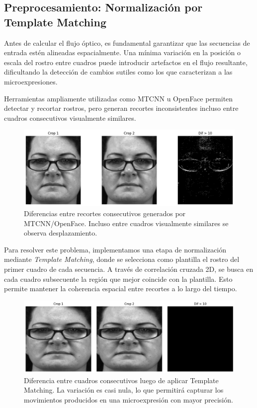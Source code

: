 \documentclass[conference]{IEEEtran}
\begin{document}
\subsection{Preprocesamiento: Normalización por Template Matching}

Antes de calcular el flujo óptico, es fundamental garantizar que las secuencias de entrada estén alineadas espacialmente. Una mínima variación en la posición o escala del rostro entre cuadros puede introducir artefactos en el flujo resultante, dificultando la detección de cambios sutiles como los que caracterizan a las microexpresiones.

Herramientas ampliamente utilizadas como MTCNN u OpenFace permiten detectar y recortar rostros, pero generan recortes inconsistentes incluso entre cuadros consecutivos visualmente similares.

\begin{figure}[h]
\centering
\includegraphics[width=0.9\linewidth]{figs/diff_before.png}
\caption{Diferencias entre recortes consecutivos generados por MTCNN/OpenFace. Incluso entre cuadros visualmente similares se observa desplazamiento.}
\label{fig:before_alignment}
\end{figure}

Para resolver este problema, implementamos una etapa de normalización mediante \textit{Template Matching}, donde se selecciona como plantilla el rostro del primer cuadro de cada secuencia. A través de correlación cruzada 2D, se busca en cada cuadro subsecuente la región que mejor coincide con la plantilla. Esto permite mantener la coherencia espacial entre recortes a lo largo del tiempo.

\begin{figure}[h]
\centering
\includegraphics[width=0.9\linewidth]{figs/diff_after.png}
\caption{Diferencia entre cuadros consecutivos luego de aplicar Template Matching. La variación es casi nula, lo que permitirá capturar los movimientos producidos en una microexpresión con mayor precisión.}
\label{fig:after_alignment}
\end{figure}
\end{document}
